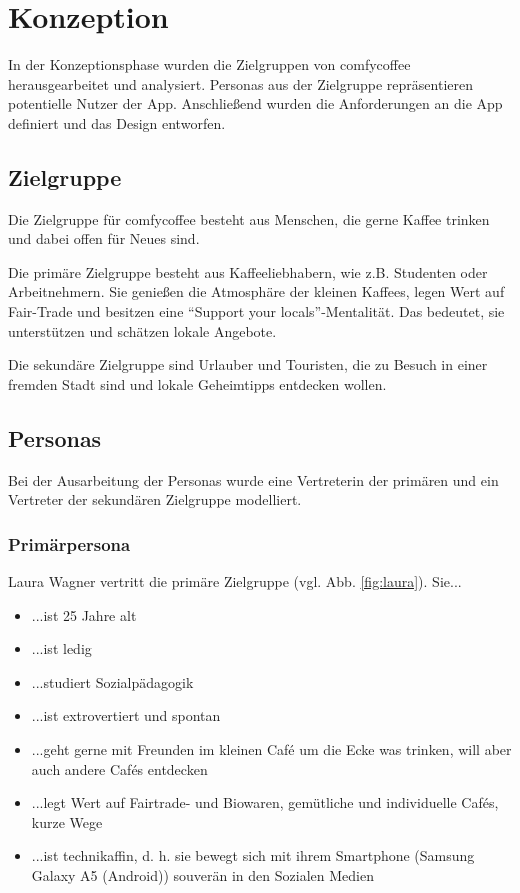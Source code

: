\chapter{Konzeption}
\label{konzeption}
In der Konzeptionsphase wurden die Zielgruppen von comfycoffee herausgearbeitet und analysiert. Personas aus der Zielgruppe repräsentieren potentielle Nutzer der App. Anschließend wurden die Anforderungen an die App definiert und das Design entworfen.

\section{Zielgruppe}
Die Zielgruppe für comfycoffee besteht aus Menschen, die gerne Kaffee trinken und dabei offen für Neues sind.

Die primäre Zielgruppe besteht aus Kaffeeliebhabern, wie z.B. Studenten oder Arbeitnehmern. Sie genießen die Atmosphäre der kleinen Kaffees, legen Wert auf Fair-Trade und besitzen eine ``Support your locals''-Mentalität. Das bedeutet, sie unterstützen und schätzen lokale Angebote.

Die sekundäre Zielgruppe sind Urlauber und Touristen, die zu Besuch in einer fremden Stadt sind und lokale Geheimtipps entdecken wollen.

\section{Personas}
Bei der Ausarbeitung der Personas wurde eine Vertreterin der primären und ein Vertreter der sekundären Zielgruppe modelliert.

\subsection{Primärpersona}
Laura Wagner vertritt die primäre Zielgruppe (vgl. Abb. \ref{fig:laura}). Sie...
\begin{itemize}
	\item ...ist 25 Jahre alt
	\item ...ist ledig
	\item ...studiert Sozialpädagogik
	\item ...ist extrovertiert und spontan
	\item ...geht gerne mit Freunden im kleinen Café um die Ecke was trinken, will aber auch andere Cafés entdecken
	\item ...legt Wert auf Fairtrade- und Biowaren, gemütliche und individuelle Cafés, kurze Wege
	\item ...ist technikaffin, d. h. sie bewegt sich mit ihrem Smartphone (Samsung Galaxy A5 (Android)) souverän in den Sozialen Medien
\end{itemize}

